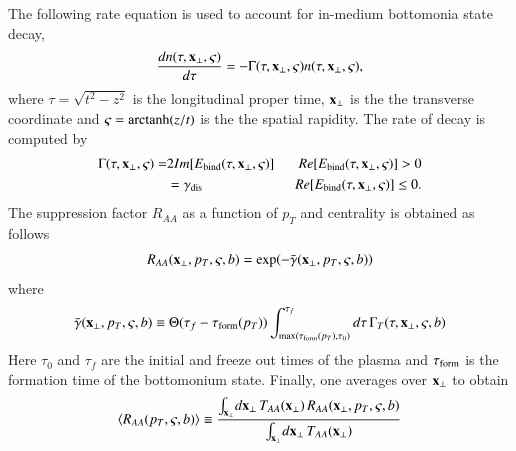 The following rate equation is used to account for in-medium bottomonia state decay,
%
\begin{equation} \label{eq:rate}
\frac{dn(\tau,{\bf x}_\perp,\varsigma)}{d\tau} = -\Gamma(\tau,{\bf x}_\perp,\varsigma)n(\tau,{\bf x}_\perp,\varsigma) ,
\end{equation}
%
where   $\tau = \sqrt{t^{2} - z^{2}}$ is the longitudinal proper time,  ${\bf x}_{\perp}$ is the the transverse coordinate and 
 $\varsigma = {\rm arctanh}(z/t)$ is the the spatial rapidity. The rate of decay is computed by~\cite{Strickland:2011aa}
%
\begin{eqnarray}
\Gamma(\tau, {\bf x}_{\perp}, \varsigma) = 
& 2Im[E_{\text{bind}}(\tau, {\bf x}_{\perp}, \varsigma)] & \ \ Re[E_{\text{bind}}(\tau, {\bf x}_{\perp}, \varsigma)] > 0 \\ 
& = \gamma_{\text{dis}} & \ \ Re[E_{\text{bind}}(\tau, {\bf x}_{\perp}, \varsigma)] \leq 0. 
\end{eqnarray}
%
The suppression factor $R_{AA}$ as a function of $p_T$ and centrality 
is obtained as follows
\begin{equation}
R_{AA}({\bf x}_\perp,p_T,\varsigma,b) =%
\exp\!\left(-\bar{\gamma}({\bf x}_\perp,p_T,\varsigma,b) \right)
\end{equation}
where
\begin{equation}
 \bar{\gamma}({\bf x}_\perp,p_T,
\varsigma,b) \equiv \Theta(\tau_f-\tau_{\rm form}(p_T)) \int_{{\rm max}(\tau_{\rm form}(p_T),\tau_0)}^{\tau_f} 
d\tau\,\Gamma_T(\tau,{\bf x}_\perp,\varsigma,b) 
\end{equation}
  Here $\tau_{0}$ and $\tau_{f}$ are the initial and freeze out times of the plasma and 
$\tau_{\rm form}$ is the formation time of the bottomonium state. 
Finally, one averages
over ${\bf x}_\perp$ to obtain 
\begin{equation}
\langle R_{AA}(p_T,\varsigma,b) \rangle \equiv 
\frac{\int_{{\bf x}_\perp} \! d{\bf x}_\perp \, T_{AA}({\bf x}_\perp)\,%
  R_{AA}({\bf x}_\perp,p_T,\varsigma,b)} 
{\int_{{\bf x}_\perp} \! d{\bf x}_\perp \, T_{AA}({\bf x}_\perp)}
\end{equation} 

